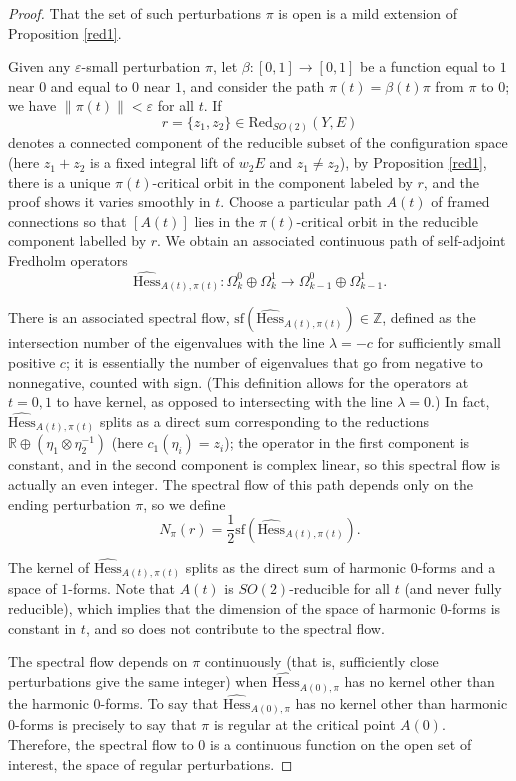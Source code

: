 \documentclass[10pt,a4paper]{amsart}
\theoremstyle{definition}
\theoremstyle{remark}
\numberwithin{figure}{qchap}
\begin{document}
\begin{proof}That the set of such perturbations $\pi$ is open is a mild extension of Proposition \ref{red1}.

Given any $\varepsilon$-small perturbation $\pi$, let $\beta: [0,1] \to [0,1]$ be a function equal to $1$ near $0$ and equal to $0$ near $1$, and consider the path $\pi(t) = \beta(t) \pi$ from $\pi$ to $0$; we have $\|\pi(t)\| < \varepsilon$ for all $t$. If 
$$r = \{z_1, z_2\} \in \text{Red}_{SO(2)}(Y,E)$$ 
denotes a connected component of the reducible subset of the configuration space (here $z_1 + z_2$ is a fixed integral lift of $w_2 E$ and $z_1 \neq z_2$), by Proposition \ref{red1}, there is a unique $\pi(t)$-critical orbit in the component labeled by $r$, and the proof shows it varies smoothly in $t$. Choose a particular path $A(t)$ of framed connections so that $[A(t)]$ lies in the $\pi(t)$-critical orbit in the reducible component labelled by $r$. We obtain an associated continuous path of self-adjoint Fredholm operators $$\widehat{\text{Hess}}_{A(t),\pi(t)}: \Omega^0_k \oplus \Omega^1_k \to \Omega^0_{k-1} \oplus \Omega^1_{k-1}.$$

There is an associated spectral flow, $\text{sf}\left(\widehat{\text{Hess}}_{A(t),\pi(t)}\right) \in \mathbb Z$, defined as the intersection number of the eigenvalues with the line $\lambda = - c$ for sufficiently small positive $c$; it is essentially the number of eigenvalues that go from negative to nonnegative, counted with sign. (This definition allows for the operators at $t = 0,1$ to have kernel, as opposed to intersecting with the line $\lambda = 0$.) In fact, $\widehat{\text{Hess}}_{A(t),\pi(t)}$ splits as a direct sum corresponding to the reductions $\mathbb R \oplus (\eta_1 \otimes \eta_2^{-1})$ (here $c_1(\eta_i) = z_i$); the operator in the first component is constant, and in the second component is complex linear, so this spectral flow is actually an even integer. The spectral flow of this path depends only on the ending perturbation $\pi$, so we define 
$$N_\pi(r) = \frac{1}{2}\text{sf}\left(\widehat{\text{Hess}}_{A(t),\pi(t)}\right).$$ 

The kernel of $\widehat{\text{Hess}}_{A(t),\pi(t)}$ splits as the direct sum of harmonic $0$-forms and a space of $1$-forms. Note that $A(t)$ is $SO(2)$-reducible for all $t$ (and never fully reducible), which implies that the dimension of the space of harmonic $0$-forms is constant in $t$, and so does not contribute to the spectral flow.

The spectral flow depends on $\pi$ continuously (that is, sufficiently close perturbations give the same integer) when $\widehat{\text{Hess}}_{A(0),\pi}$ has no kernel other than the harmonic 0-forms. To say that $\widehat{\text{Hess}}_{A(0),\pi}$ has no kernel other than harmonic 0-forms is precisely to say that $\pi$ is regular at the critical point $A(0)$. Therefore, the spectral flow to $0$ is a continuous function on the open set of interest, the space of regular perturbations.


\end{proof}
\end{document}
